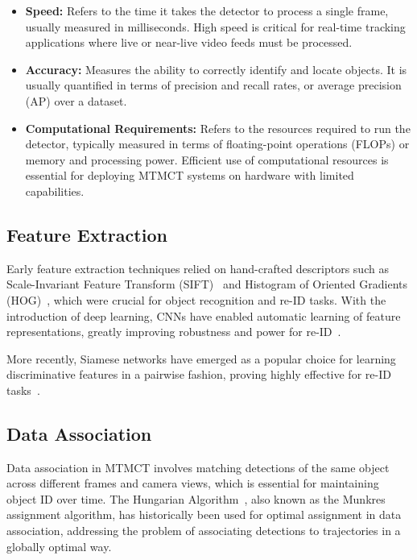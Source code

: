 \begin{itemize}
	\item \textbf{Speed:} Refers to the time it takes the detector to process a single frame, usually measured in milliseconds. High speed is critical for real-time tracking applications where live or near-live video feeds must be processed.
	\item \textbf{Accuracy:} Measures the ability to correctly identify and locate objects. It is usually quantified in terms of precision and recall rates, or average precision (AP) over a dataset.
	\item \textbf{Computational Requirements:} Refers to the resources required to run the detector, typically measured in terms of floating-point operations (FLOPs) or memory and processing power. Efficient use of computational resources is essential for deploying MTMCT systems on hardware with limited capabilities.
\end{itemize}

\subsection{Feature Extraction}\label{subsec:milestone:eature_extraction}
Early feature extraction techniques relied on hand-crafted descriptors such as Scale-Invariant Feature Transform (SIFT)~\cite{Lowe04} and Histogram of Oriented Gradients (HOG)~\cite{Dalal05}, which were crucial for object recognition and re-ID tasks. With the introduction of deep learning, CNNs have enabled automatic learning of feature representations, greatly improving robustness and power for re-ID~\cite{Krizhevsky12, He16}.

More recently, Siamese networks have emerged as a popular choice for learning discriminative features in a pairwise fashion, proving highly effective for re-ID tasks~\cite{Varior16}.

\subsection{Data Association}\label{subsec:milestone_data_association}
Data association in MTMCT involves matching detections of the same object across different frames and camera views, which is essential for maintaining object ID over time. The Hungarian Algorithm~\cite{Kuhn55}, also known as the Munkres assignment algorithm, has historically been used for optimal assignment in data association, addressing the problem of associating detections to trajectories in a globally optimal way.


